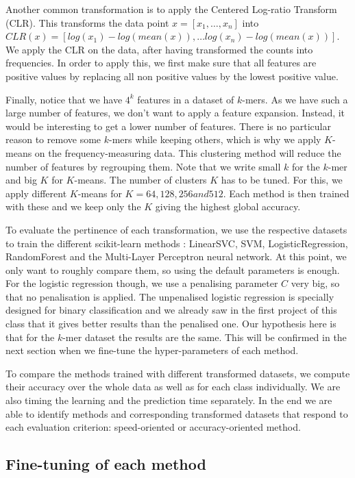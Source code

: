 \documentclass{article}
\begin{document}
\begin{multicols}{2}
		Another common transformation is to apply the Centered Log-ratio Transform (CLR). This transforms the data point $x = [x_1, …, x_n]$ into $CLR(x) = [log(x_1) - log(mean(x)), … log(x_n) - log(mean(x))]$. We apply the CLR on the data, after having transformed the counts into frequencies. In order to apply this, we first make sure that all features are positive values by replacing all non positive values by the lowest positive value.
		
		Finally, notice that we have $4^k$ features in a dataset of $k$-mers. As we have such a large number of features, we don’t want to apply a feature expansion. Instead, it would be interesting to get a lower number of features. There is no particular reason to remove some $k$-mers while keeping others, which is why we apply $K$-means on the frequency-measuring data. This clustering method will reduce the number of features by regrouping them. Note that we write small $k$ for the $k$-mer and big $K$ for $K$-means. The number of clusters $K$ has to be tuned. For this, we apply different $K$-means for $K = 64, 128, 256 and 512$. Each method is then trained with these and we keep only the $K$ giving the highest global accuracy.
		
		To evaluate the pertinence of each transformation, we use the respective datasets to train the different scikit-learn methods : LinearSVC, SVM, LogisticRegression, RandomForest and the Multi-Layer Perceptron neural network. At this point, we only want to roughly compare them, so using the default parameters is enough. For the logistic regression though, we use a penalising parameter $C$ very big, so that no penalisation is applied. The unpenalised logistic regression is specially designed for binary classification and we already saw in the first project of this class that it gives better results than the penalised one. Our hypothesis here is that for the $k$-mer dataset the results are the same. This will be confirmed in the next section when we fine-tune the hyper-parameters of each method.
		
		To compare the methods trained with different transformed datasets, we compute their accuracy over the whole data as well as for each class individually. We are also timing the learning and the prediction time separately. In the end we are able to identify methods and corresponding transformed datasets that respond to each evaluation criterion: speed-oriented or accuracy-oriented method.
		
		\subsection{Fine-tuning of each method}
		

\end{multicols}
\end{document}
